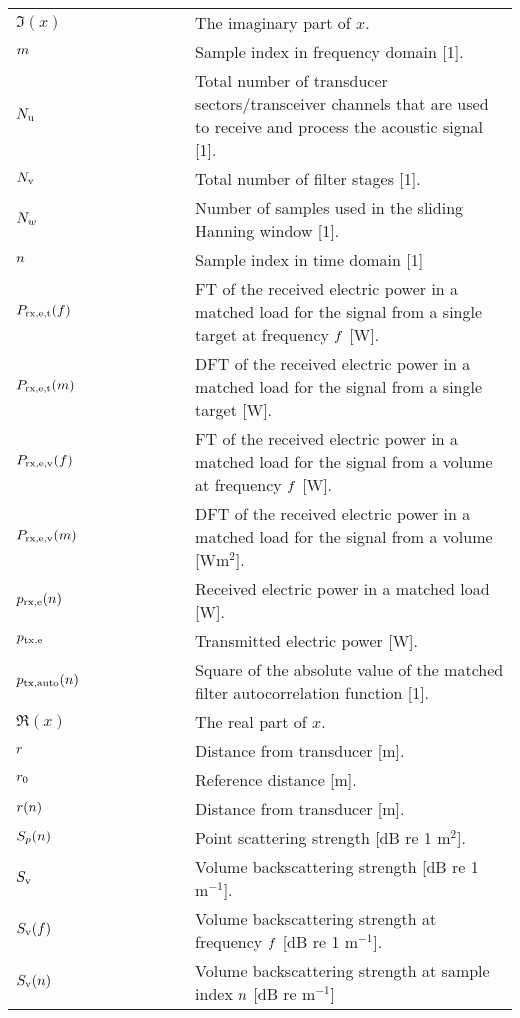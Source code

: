 \documentclass[12pt,a4paper]{article}
\begin{document}
\begin{longtable}{p{0.15\linewidth} p{0.2\linewidth} p{0.65\linewidth} }
$\Im(x)$ & & The imaginary part of $x$.\\

$m$ & & Sample index in frequency domain [1].\\

$N_{\textrm{u}}$ & & Total number of transducer sectors/transceiver channels that are used to receive and process the acoustic signal [1].\\
$N_{\textrm{v}}$ & & Total number of filter stages [1].\\
$N_{w}$ & & Number of samples used in the sliding Hanning window [1].\\
$n$ & & Sample index in time domain [1]\\

$P_{\textrm{rx,e,t}}(f)$ & & FT of the received electric power in a matched load for the signal from a single target at frequency $f$ [W].\\
$P_{\textrm{rx,e,t}}(m)$ & & DFT of the received electric power in a matched load for the signal from a single target [W].\\
$P_{\textrm{rx,e,v}}(f)$ & & FT of the received electric power in a matched load for the signal from a volume at frequency $f$ [W].\\
$P_{\textrm{rx,e,v}}(m)$ & & DFT of the received electric power in a matched load for the signal from a volume [W$\textrm{m}^2$].\\
$p_{\textrm{rx,e}}(n)$  & & Received electric power in a matched load [W].\\

$p_{\textrm{tx,e}}$ & & Transmitted electric power [W].\\
$p_{\textrm{tx,auto}}(n)$ & & Square of the absolute value of the matched filter autocorrelation function [1].\\

$\Re(x)$ & & The real part of $x$.\\
$r$ & & Distance from transducer [m].\\
$r_0$ & & Reference distance [m]. \\
$r(n)$ & & Distance from transducer [m].\\

$S_p(n)$  & & Point scattering strength [dB re 1 $\textrm{m}^2$].\\
$S_{\textrm{v}}$  & & Volume backscattering strength [dB re 1 $\textrm{m}^{-1}$].\\
$S_{\textrm{v}}(f)$ & & Volume backscattering strength at frequency $f$ [dB re 1 $\textrm{m}^{-1}$].\\
$S_{\textrm{v}}(n)$ & & Volume backscattering strength at sample index $n$ [dB re $\textrm{m}^{-1}$]\\


\end{longtable}
\end{document}

